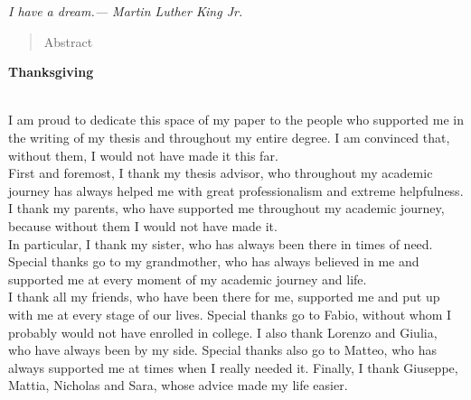 \documentclass[a4paper,final,12pt]{report}
\newcommand\tab[1][13mm]{\hspace*{#1}}
\begin{document}
\restoregeometry
\clearpage\null\thispagestyle{empty}\newpage

\cleardoublepage

    \begin{flushright}
    \thispagestyle{empty}
    \null{}
    \emph{I have a dream.\break --- Martin Luther King Jr.}
    \null
    \end{flushright}
    \cleardoublepage
    
    \clearpage\null\thispagestyle{empty}\newpage
    
    \begin{abstract}
    Abstract
    \end{abstract}
    
    
    \setlength{\parindent}{0pt}
    \begin{LARGE}
    \textbf{Thanksgiving\\\\}
    \end{LARGE}
    \tab[10pt] I am proud to dedicate this space of my paper to the people who supported me in the writing of my thesis and throughout my entire degree. I am convinced that, without them, I would not have made it this far.\\
    \tab[10pt] First and foremost, I thank my thesis advisor, who throughout my academic journey has always helped me with great professionalism and extreme helpfulness.\\
    \tab[10pt] I thank my parents, who have supported me throughout my academic journey, because without them I would not have made it. \\
    \tab[10pt] In particular, I thank my sister, who has always been there in times of need.\\
    \tab[10pt] Special thanks go to my grandmother, who has always believed in me and supported me at every moment of my academic journey and life.\\
    \tab[10pt] I thank all my friends, who have been there for me, supported me and put up with me at every stage of our lives. Special thanks go to Fabio, without whom I probably would not have enrolled in college. I also thank Lorenzo and Giulia, who have always been by my side. Special thanks also go to Matteo, who has always supported me at times when I really needed it. Finally, I thank Giuseppe, Mattia, Nicholas and Sara, whose advice made my life easier. 
\end{document}
